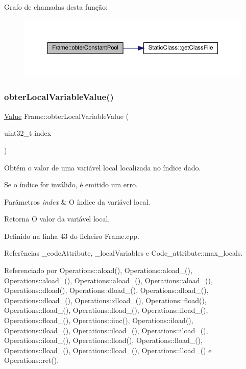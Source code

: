 Grafo de chamadas desta função\+:
\nopagebreak
\begin{figure}[H]
\begin{center}
\leavevmode
\includegraphics[width=350pt]{classFrame_a77f9705e64bfbdfc68921b7de11a893f_cgraph}
\end{center}
\end{figure}
\mbox{\label{classFrame_ae074652eb3b71fb4cb28afd1ba91885d}} 
\subsubsection{\texorpdfstring{obter\+Local\+Variable\+Value()}{obterLocalVariableValue()}}
{\footnotesize\ttfamily \hyperlink{structValue}{Value} Frame\+::obter\+Local\+Variable\+Value (\begin{DoxyParamCaption}\item[{uint32\+\_\+t}]{index }\end{DoxyParamCaption})}



Obtém o valor de uma variável local localizada no índice dado. 

Se o índice for inválido, é emitido um erro. 
\begin{DoxyParams}{Parâmetros}
{\em index} & O índice da variável local. \\
\hline
\end{DoxyParams}
\begin{DoxyReturn}{Retorna}
O valor da variável local. 
\end{DoxyReturn}


Definido na linha 43 do ficheiro Frame.\+cpp.



Referências \+\_\+code\+Attribute, \+\_\+local\+Variables e Code\+\_\+attribute\+::max\+\_\+locals.



Referenciado por Operations\+::aload(), Operations\+::aload\+\_(), Operations\+::aload\+\_(), Operations\+::aload\+\_(), Operations\+::aload\+\_(), Operations\+::dload(), Operations\+::dload\+\_(), Operations\+::dload\+\_(), Operations\+::dload\+\_(), Operations\+::dload\+\_(), Operations\+::fload(), Operations\+::fload\+\_(), Operations\+::fload\+\_(), Operations\+::fload\+\_(), Operations\+::fload\+\_(), Operations\+::iinc(), Operations\+::iload(), Operations\+::iload\+\_(), Operations\+::iload\+\_(), Operations\+::iload\+\_(), Operations\+::iload\+\_(), Operations\+::lload(), Operations\+::lload\+\_(), Operations\+::lload\+\_(), Operations\+::lload\+\_(), Operations\+::lload\+\_() e Operations\+::ret().

